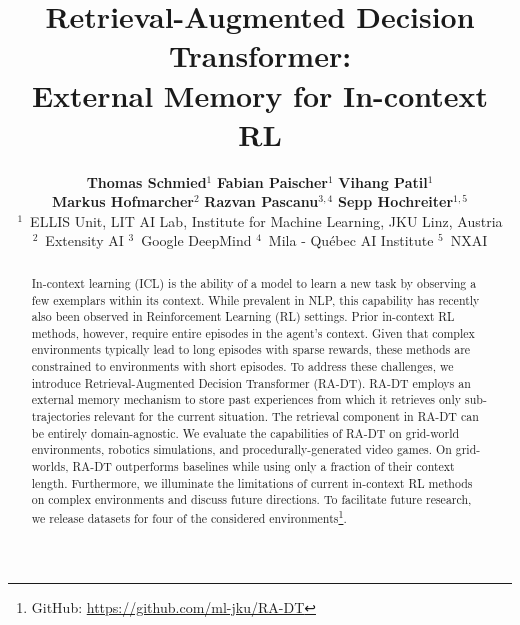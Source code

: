 \documentclass{article}
\title{Retrieval-Augmented Decision Transformer: \\External Memory for In-context RL}
\author{
  \textbf{Thomas Schmied}$^{1}$\qquad
  \textbf{Fabian Paischer}$^{1}$\qquad
  \textbf{Vihang Patil}$^{1}$\qquad\\
  \;\textbf{Markus Hofmarcher}$^{2}$\qquad
  \textbf{Razvan Pascanu}$^{3,4}$\qquad
  \textbf{Sepp Hochreiter}$^{1,5}$ \\
  $^{1}$~ELLIS Unit, LIT AI Lab, Institute for Machine Learning, JKU Linz, Austria\\
  $^{2}$~Extensity AI\; $^{3}$~Google DeepMind\; $^{4}$~Mila - Québec AI Institute\; $^{5}$~NXAI
}
\newcommand{\stoptocwriting}{\addtocontents{toc}{\protect\setcounter{tocdepth}{0}}}
\begin{document}
\stoptocwriting
\maketitle
\begin{abstract}
In-context learning (ICL) is the ability of a model to learn a new task by observing a few exemplars within its context.
While prevalent in NLP, this capability has recently also been observed in Reinforcement Learning (RL) settings.
Prior in-context RL methods, however, require entire episodes in the agent's context.
Given that complex environments typically lead to
long episodes with sparse rewards, these methods are constrained to environments with short episodes.
To address these challenges, we introduce Retrieval-Augmented Decision Transformer (RA-DT).
RA-DT employs an external memory mechanism to store past experiences from which it retrieves only sub-trajectories relevant for the current situation.
The retrieval component in RA-DT can be entirely domain-agnostic.
We evaluate the capabilities of RA-DT on grid-world environments, robotics simulations, and procedurally-generated video games.
On grid-worlds, RA-DT outperforms baselines while using only a fraction of their context length.
Furthermore, we illuminate the limitations of current in-context RL methods on complex environments and discuss future directions. To facilitate future research, we release datasets for four of the considered environments\footnote{GitHub: \url{https://github.com/ml-jku/RA-DT}}.
\end{abstract}
\end{document}
